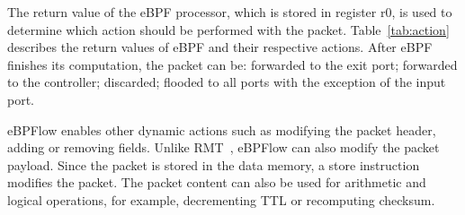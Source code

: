 The return value of the eBPF processor, which is stored in register r0, is used to determine which action should be performed with the packet. Table~\ref{tab:action} describes the return values of eBPF and their respective actions. After eBPF finishes its computation, the packet can be: forwarded to the exit port; forwarded to the controller; discarded; flooded to all ports with the exception of the input port.


eBPFlow enables other dynamic actions such as modifying the packet header, adding or removing fields.
Unlike RMT~\cite{bosshart2013forwarding}, eBPFlow can also modify the packet payload.
Since the packet is stored in the data memory, a store instruction modifies the packet. The packet content can also be used for arithmetic and logical operations, for example, decrementing TTL or recomputing checksum.

